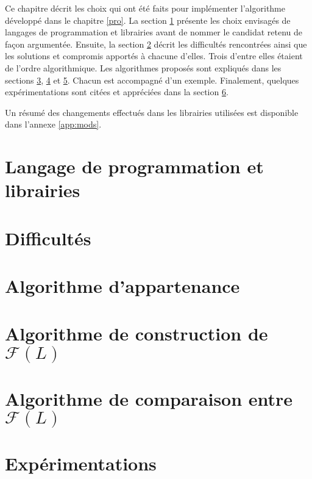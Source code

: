 Ce chapitre décrit les choix qui ont été faits pour implémenter l'algorithme développé dans le chapitre \ref{pro}. La section \ref{sec:lprog} présente les choix envisagés de langages de programmation et librairies avant de nommer le candidat retenu de façon argumentée.
Ensuite, la section \ref{sec:diffs} décrit les difficultés rencontrées ainsi que les solutions et compromis apportés à chacune d'elles. Trois d'entre elles étaient de l'ordre algorithmique. Les algorithmes proposés sont expliqués dans les sections \ref{sec:app}, \ref{sec:fl} et \ref{sec:fll}. Chacun est accompagné d'un exemple.
Finalement, quelques expérimentations sont citées et appréciées dans la section \ref{sec:exps}.

Un résumé des changements effectués dans les librairies utilisées est disponible dans l'annexe \ref{app:mods}.

\section{Langage de programmation et librairies}\label{sec:lprog}
\section{Difficultés}\label{sec:diffs}
\section{Algorithme d'appartenance}\label{sec:app}
\section{Algorithme de construction de $\mathcal{F}(L)$}\label{sec:fl}
\section{Algorithme de comparaison entre $\mathcal{F}(L)$}\label{sec:fll}
\section{Expérimentations}\label{sec:exps}
